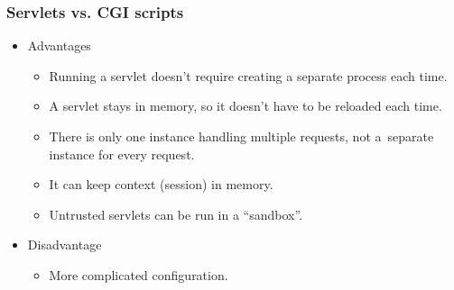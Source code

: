 \documentclass[10pt,xcolor=pdflatex]{beamer}
\begin{document}
\begin{frame}\frametitle{Servlets vs. CGI scripts}
  \begin{itemize}
  	\item Advantages
    	\begin{itemize}
        	\item Running a servlet doesn’t require creating a separate process each time.
			\item A servlet stays in memory, so it doesn’t have to be reloaded each time.
			\item There is only one instance handling multiple requests, not a~separate instance for every request.
            \item It can keep context (session) in memory.
			\item Untrusted servlets can be run in a “sandbox”. \newline
        \end{itemize} 
       
	\item Disadvantage
	    \begin{itemize}
        	\item More complicated configuration.
        \end{itemize}	
  \end{itemize}
\end{frame}
\end{document}
